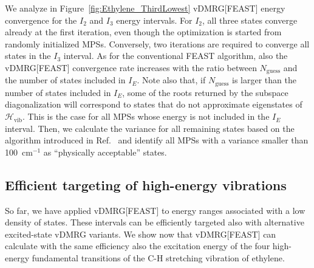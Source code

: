 \documentclass[journal=jctcce]{achemso}
\begin{document}
\noindent We analyze in Figure~\ref{fig:Ethylene_ThirdLowest} vDMRG[FEAST] energy convergence for the $I_2$ and $I_3$ energy intervals.
For $I_2$, all three states converge already at the first iteration, even though the optimization is started from randomly initialized MPSs.
Conversely, two iterations are required to converge all states in the $I_3$ interval.
As for the conventional FEAST algorithm,\cite{Polizzi2009_FEAST} also the vDMRG[FEAST] convergence rate increases with the ratio between $N_\text{guess}$ and the number of states included in $I_E$.
Note also that, if $N_\text{guess}$ is larger than the number of states included in $I_E$, some of the roots returned by the subspace diagonalization will correspond to states that do not approximate eigenstates of $\mathcal{H}_\text{vib}$.
This is the case for all MPSs whose energy is not included in the $I_E$ interval.
Then, we calculate the variance for all remaining states based on the algorithm introduced in Ref.~
and identify all MPSs with a variance smaller than 100~cm$^{-1}$ as ``physically acceptable'' states.

\subsection{Efficient targeting of high-energy vibrations}
\label{subsec:HighEnergy_FEAST}

\noindent So far, we have applied vDMRG[FEAST] to energy ranges associated with a low density of states.
These intervals can be efficiently targeted also with alternative excited-state vDMRG variants.\cite{Baiardi2019_HighEnergy-vDMRG}
We show now that vDMRG[FEAST] can calculate with the same efficiency also the excitation energy of the four high-energy fundamental transitions of the C-H stretching vibration of ethylene.
\end{document}
